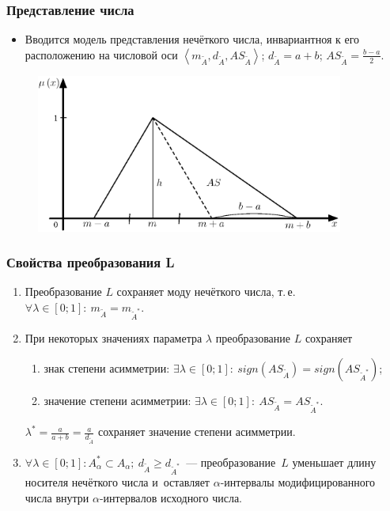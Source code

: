 \documentclass[12pt]{beamer}
\begin{document}

\begin{frame}
  \frametitle{Представление числа}
  \begin{itemize}
    \item Вводится модель представления нечёткого числа, инвариантноя к его расположению на числовой оси  $\left\langle m_{\tilde A}, d_{\tilde A}, AS_{\tilde A} \right\rangle$; $d_{\tilde A} = a+b$; $\displaystyle AS_{\tilde A} = \frac{b-a}{2}$.
  \end{itemize}
  \begin{figure}[h]
    \includegraphics[width=0.9\textwidth]{as-degree}
  \end{figure}
\end{frame}


\begin{frame}
  \frametitle{Свойства преобразования L}
  \begin{enumerate}
    \item Преобразование $L$ сохраняет моду нечёткого числа, т.\,е. $\forall \lambda \in \left[ 0;1 \right]:\ m_{\tilde A}=m_{\tilde A^{*}}$.
    \item При некоторых значениях параметра $\lambda$ преобразование $L$ сохраняет
      \begin{enumerate}
        \item знак степени асимметрии: $\exists \lambda \in [0;1]:\ sign(AS_{\tilde A})=sign(AS_{\tilde A^{*}})$;
        \item значение степени асимметрии: $\exists \lambda \in [0;1]:\ AS_{\tilde A}=AS_{\tilde A^{*}}$.
      \end{enumerate}
      $\displaystyle \lambda^* =\frac{a}{a+b}=\frac{a}{d_{\tilde A}}$ сохраняет значение степени асимметрии.
    \item $\forall \lambda \in \left[ 0;1 \right]: A_{\alpha}^{*}\subset A_\alpha;\ d_{\tilde A} \geqslant d_{\tilde A^{*}}$~--- преобразование~$L$ уменьшает длину носителя нечёткого числа и~оставляет $\alpha$-интервалы модифицированного числа внутри $\alpha$-интервалов исходного числа.
  \end{enumerate}
\end{frame}
\end{document}

